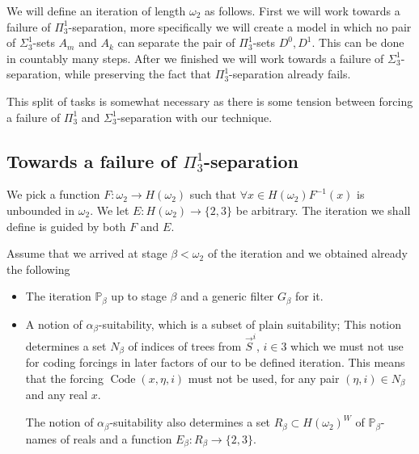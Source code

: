 \documentclass[a4paper,11pt]{article}
\newcommand{\forceP}{\mathbb{P}}
\begin{document}
{We will define an iteration of length $\omega_2$ as follows. First we will work towards a failure of $\Pi^1_3$-separation, more specifically we will create a model in which no pair of $\Sigma^1_3$-sets $A_m$ and $A_k$ can separate the pair of $\Pi^1_3$-sets $D^0,D^1$. This can be done in countably many steps. After we finished we will work towards a failure of $\Sigma^1_3$-separation, while preserving the fact that $\Pi^1_3$-separation already fails. 

This split of tasks is somewhat necessary as there is some tension between forcing a failure of $\Pi^1_3$ and $\Sigma^1_3$-separation with our technique.


\subsection{Towards a failure of $\Pi^1_3$-separation}
We pick a function $F: \omega_2 \rightarrow H(\omega_2)$ such that $\forall x \in H(\omega_2) F^{-1} (x)$ is unbounded in $\omega_2$. We let $E: H(\omega_2) \rightarrow \{2,3\}$ be arbitrary. The iteration we shall define is guided by both $F$ and $E$. 

Assume that we arrived at stage $\beta<\omega_2$ of the iteration and we obtained already the following
\begin{itemize}
\item The iteration $\forceP_{\beta}$ up to stage $\beta$ and a generic filter $G_{\beta}$ for it.
\item A notion of $\alpha_{\beta}$-suitability, which is a subset of plain suitability; This notion determines a set $N_{\beta}$ of indices of trees from $\vec{S}^i$, $i \in 3$ which we must not use for coding forcings in later factors of our to be defined iteration. This means that the forcing $\operatorname{Code}(x,\eta,i)$ must not be used, for any pair $(\eta,i) \in N_{\beta}$ and any real $x$.

The notion of $\alpha_{\beta}$-suitability also determines a set $R_{\beta} \subset H(\omega_2)^W$ of $\forceP_{\beta}$-names of reals and a function $E_{\beta}: R_{\beta} \rightarrow \{2,3\}$.

\end{itemize}

}
\end{document}
